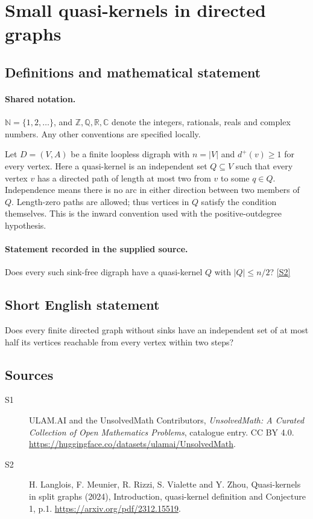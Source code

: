 \documentclass[11pt]{article}
\newcommand{\sref}[2]{\hyperlink{source:#1:#2}{[S#2]}}
\begin{document}
\section{Small quasi-kernels in directed graphs}\label{statement}

\subsection{Definitions and mathematical statement}

\paragraph{Shared notation.}$\mathbb N=\{1,2,\ldots\}$, and $\mathbb Z,\mathbb Q,\mathbb R,\mathbb C$ denote the integers, rationals, reals and complex numbers. Any other conventions are specified locally.


Let $D=(V,A)$ be a finite loopless digraph with $n=|V|$ and $d^+(v)\ge1$ for every vertex. Here a quasi-kernel is an independent set $Q\subseteq V$ such that every vertex $v$ has a directed path of length at most two from $v$ to some $q\in Q$. Independence means there is no arc in either direction between two members of $Q$. Length-zero paths are allowed; thus vertices in $Q$ satisfy the condition themselves. This is the inward convention used with the positive-outdegree hypothesis.
\paragraph{Statement recorded in the supplied source.}
Does every such sink-free digraph have a quasi-kernel $Q$ with $|Q|\le n/2$? \sref{statement}{2}
\subsection{Short English statement}
Does every finite directed graph without sinks have an independent set of at most half its vertices reachable from every vertex within two steps?
\subsection{Sources}
\begin{description}
\item[\hypertarget{source:statement:1}{S1}] ULAM.AI and the UnsolvedMath Contributors, \emph{UnsolvedMath: A Curated Collection of Open Mathematics Problems}, catalogue entry. CC BY 4.0. \url{https://huggingface.co/datasets/ulamai/UnsolvedMath}.
\item[\hypertarget{source:statement:2}{S2}] H. Langlois, F. Meunier, R. Rizzi, S. Vialette and Y. Zhou, Quasi-kernels in split graphs (2024), Introduction, quasi-kernel definition and Conjecture 1, p.1. \url{https://arxiv.org/pdf/2312.15519}.
\end{description}
\label{end:statement}
\end{document}

